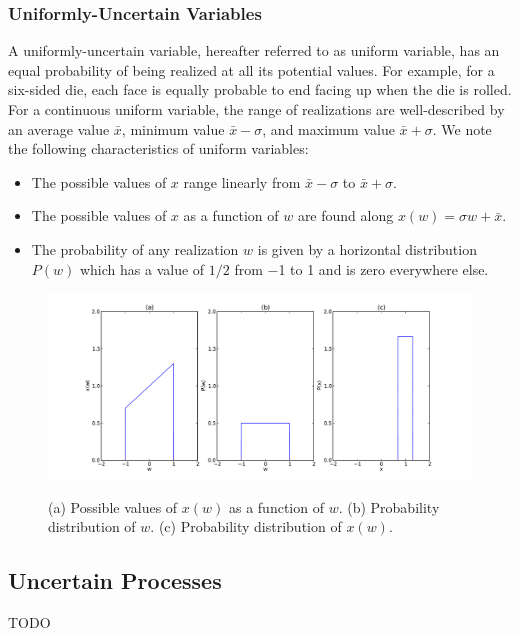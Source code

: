 \documentclass[11pt]{article} %
\begin{document}
\subsubsection{Uniformly-Uncertain Variables}
A uniformly-uncertain variable, hereafter referred to as uniform variable, has an equal probability of being realized at all its potential values.  For example, for a six-sided die, each face is equally probable to end facing up when the die is rolled.  For a continuous uniform variable, the range of realizations are well-described by an average value $\bar x$, minimum value $\bar x -\sigma$, and maximum value $\bar x+\sigma$.  We note the following characteristics of uniform variables:
\begin{itemize}
\item The possible values of $x$ range linearly from $\bar x-\sigma$ to $\bar x+\sigma$.
\item The possible values of $x$ as a function of $w$ are found along $x(w)=\sigma w+\bar x$.
\item The probability of any realization $w$ is given by a horizontal distribution $P(w)$ which has a value of $1/2$ from $-$1 to 1 and is zero everywhere else.
\end{itemize}
\begin{figure}[h!]
\centering
\includegraphics[width=\linewidth]{figUniVar}
\label{figUniVar}
\caption{(a) Possible values of $x(w)$ as a function of $w$. (b) Probability distribution of $w$. \newline(c) Probability distribution of $x(w)$.}
\end{figure}

\subsection{Uncertain Processes}
TODO
\end{document}
